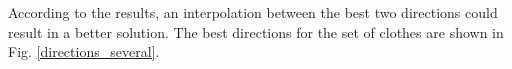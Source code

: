 
According to the results, an interpolation between the best two directions could result in a better solution. The best directions for the set of clothes are shown in Fig. \ref{directions_several}. %


